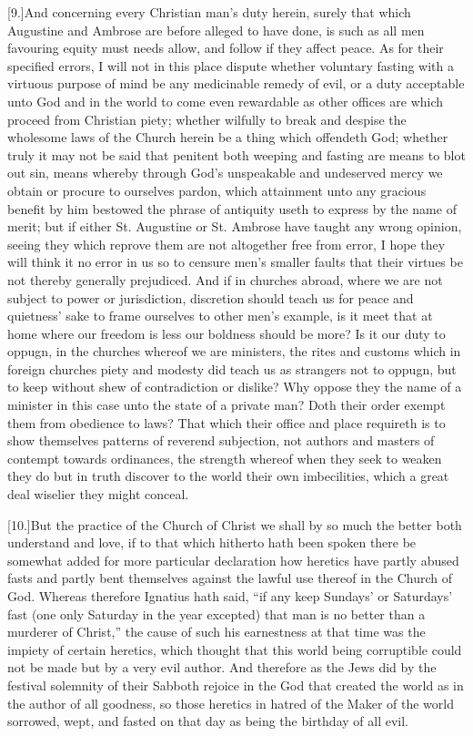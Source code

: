 [9.]And concerning every Christian man’s duty herein, surely that which Augustine and Ambrose are before alleged to have done, is such as all men favouring equity must needs allow, and follow if they affect peace. As for their specified errors, I will not in this place dispute whether voluntary fasting with a virtuous purpose of mind be any medicinable remedy of evil, or a duty acceptable unto God and in the world to come even rewardable as other offices are which proceed from Christian piety; whether wilfully to break and despise the wholesome laws of the Church herein be a thing which offendeth God; whether truly it may not be said that penitent both weeping and fasting are means to blot out sin, means whereby through God’s unspeakable and undeserved mercy we obtain or procure to ourselves pardon,  which attainment unto any gracious benefit by him bestowed the phrase of antiquity useth to express by the name of merit;
 but if either St. Augustine or St. Ambrose have taught any wrong opinion, seeing they which reprove them are not altogether free from error, I hope they will think it no error in us so to censure men’s smaller faults that their virtues be not thereby generally prejudiced. And if in churches abroad, where we are not subject to power or jurisdiction, discretion should teach us for peace and quietness’ sake to frame ourselves to other men’s example, is it meet that at home where our freedom is less our boldness should be more? Is it our duty to oppugn, in the churches whereof we are ministers, the rites and customs which in foreign churches piety and modesty did teach us as strangers not to oppugn, but to keep without shew of contradiction or dislike? Why oppose they the name of a minister in this case unto the state of a private man? Doth their order exempt them from obedience to laws? That which their office and place requireth is to show themselves patterns of reverend subjection, not authors and masters of contempt towards ordinances, the strength whereof when they seek to weaken they do but in truth discover to the world their own imbecilities, which a great deal wiselier they might conceal.

[10.]But the practice of the Church of Christ we shall by so much the better both understand and love, if to that which hitherto hath been spoken there be somewhat added for more particular declaration how heretics have partly abused fasts and partly bent themselves against the lawful use thereof in the Church of God. Whereas therefore Ignatius hath said, “if any keep Sundays’ or Saturdays’ fast (one only Saturday in the year excepted) that man is no better than a murderer of Christ,” the cause of such his earnestness at that time was the impiety of certain heretics, which thought  that this world being corruptible could not be made but by a very evil author.
 And therefore as the Jews did by the festival solemnity of their Sabboth rejoice in the God that created the world as in the author of all goodness, so those heretics in hatred of the Maker of the world sorrowed, wept, and fasted on that day as being the birthday of all evil.

